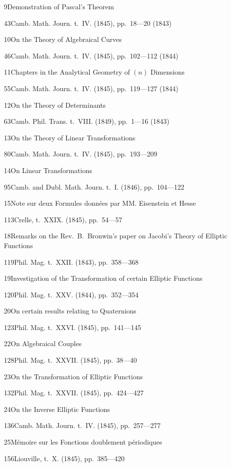 \documentclass[11pt,a4paper]{book}
\providecommand{\tocentry}[2]{#1\dotfill #2\par}
\begin{document}
\tocentry{9}{Demonstration of Pascal's Theorem}{43}{Camb. Math. Journ. t.~IV. (1845), pp.~18---20 (1843)}

\tocentry{10}{On the Theory of Algebraical Curves}{46}{Camb. Math. Journ. t.~IV. (1845), pp.~102---112 (1844)}

\tocentry{11}{Chapters in the Analytical Geometry of $(n)$ Dimensions}{55}{Camb. Math. Journ. t.~IV. (1845), pp.~119---127 (1844)}

\tocentry{12}{On the Theory of Determinants}{63}{Camb. Phil. Trans. t.~VIII. (1849), pp.~1---16 (1843)}

\tocentry{13}{On the Theory of Linear Transformations}{80}{Camb. Math. Journ. t.~IV. (1845), pp.~193---209}

\tocentry{14}{On Linear Transformations}{95}{Camb. and Dubl. Math. Journ. t.~I. (1846), pp.~104---122}

\newpage

\tocentry{15}{Note sur deux Formules donn\'{e}es par MM. Eisenstein et Hesse}{113}{Crelle, t.~XXIX. (1845), pp.~54---57}



\tocentry{18}{Remarks on the Rev.~B.~Bronwin's paper on Jacobi's Theory of Elliptic Functions}{119}{Phil. Mag. t.~XXII. (1843), pp.~358---368}

\tocentry{19}{Investigation of the Transformation of certain Elliptic Functions}{120}{Phil. Mag. t.~XXV. (1844), pp.~352---354}

\tocentry{20}{On certain results relating to Quaternions}{123}{Phil. Mag. t.~XXVI. (1845), pp.~141---145}


\tocentry{22}{On Algebraical Couples}{128}{Phil. Mag. t.~XXVII. (1845), pp.~38---40}

\tocentry{23}{On the Transformation of Elliptic Functions}{132}{Phil. Mag. t.~XXVII. (1845), pp.~424---427}

\tocentry{24}{On the Inverse Elliptic Functions}{136}{Camb. Math. Journ. t.~IV. (1845), pp.~257---277}

\tocentry{25}{M\'{e}moire sur les Fonctions doublement p\'{e}riodiques}{156}{Liouville, t.~X. (1845), pp.~385---420}
\end{document}

